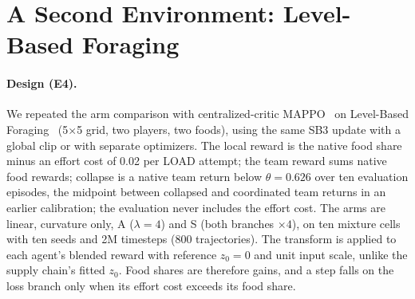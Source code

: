 
\FloatBarrier

\FloatBarrier
\section{A Second Environment: Level-Based Foraging}
\label{sec:lbf}

\paragraph{Design (E4).}
We repeated the arm comparison with centralized-critic MAPPO~\citep{yu2022surprising} on Level-Based
Foraging~\citep{christianos2020shared} (5$\times$5 grid, two players, two foods), using the same SB3
update with a global clip or with separate optimizers. The local reward is the native food share minus
an effort cost of 0.02 per LOAD attempt; the team reward sums native food rewards; collapse is a native
team return below $\theta=0.626$ over ten evaluation episodes, the midpoint between collapsed and coordinated team returns in an earlier calibration; the evaluation never includes the effort cost. The arms are
linear, curvature only, A ($\lambda=4$) and S (both branches $\times4$), on ten mixture cells with ten
seeds and 2M timesteps (800 trajectories). The transform is applied to each agent's blended reward with reference $z_0=0$ and unit
input scale, unlike the supply chain's fitted $z_0$. Food shares are therefore gains, and a step falls on the
loss branch only when its effort cost exceeds its food share.

